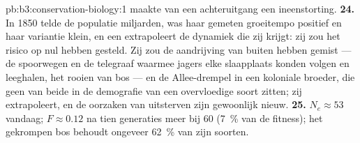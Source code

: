 \begin{solution}{pb:b3:conservation-biology:1}
 maakte van een achteruitgang een ineenstorting.
\textbf{24.} In 1850 telde de populatie miljarden, was haar gemeten
groeitempo positief en haar variantie klein, en een  extrapoleert de dynamiek die zij krijgt: zij zou het
risico op nul hebben gesteld. Zij zou de aandrijving van buiten hebben
gemist --- de spoorwegen en de telegraaf waarmee jagers elke
slaapplaats konden volgen en leeghalen, het rooien van bos --- en de
Allee-drempel in een koloniale broeder, die geen van beide in de
demografie van een overvloedige soort zitten; zij extrapoleert, en de
oorzaken van uitsterven zijn gewoonlijk nieuw.
\textbf{25.} $N_{e} \approx 53$ vandaag; $F \approx 0.12$ na tien
generaties meer bij 60 (\qty{7}{\%} van de fitness); het gekrompen bos
behoudt ongeveer \qty{62}{\%} van zijn soorten.
\end{solution}
